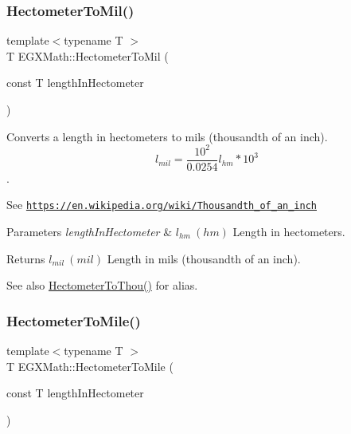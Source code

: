 \subsubsection{\texorpdfstring{Hectometer\+To\+Mil()}{HectometerToMil()}}
{\footnotesize\ttfamily template$<$typename T $>$ \\
T E\+G\+X\+Math\+::\+Hectometer\+To\+Mil (\begin{DoxyParamCaption}\item[{const T}]{length\+In\+Hectometer }\end{DoxyParamCaption})}



Converts a length in hectometers to mils (thousandth of an inch). \[ l_{mil}= \frac{10^{2}}{0.0254} l_{hm} * 10^{3} \]. 

See \href{https://en.wikipedia.org/wiki/Thousandth_of_an_inch}{\tt https\+://en.\+wikipedia.\+org/wiki/\+Thousandth\+\_\+of\+\_\+an\+\_\+inch} 
\begin{DoxyParams}{Parameters}
{\em length\+In\+Hectometer} & $ l_{hm}\ (hm)$ Length in hectometers. \\
\hline
\end{DoxyParams}
\begin{DoxyReturn}{Returns}
$ l_{mil}\ (mil)$ Length in mils (thousandth of an inch). 
\end{DoxyReturn}
\begin{DoxySeeAlso}{See also}
\mbox{\hyperlink{group___e_g_x_math-_conversions-_length_conversions-_s_i-_hectometer-_imperial_gabfd81bd5bb9e8293005c23794f541a1c}{Hectometer\+To\+Thou()}} for alias. 
\end{DoxySeeAlso}
\mbox{\label{group___e_g_x_math-_conversions-_length_conversions-_s_i-_hectometer-_imperial_gabb3930dfb3335dc53303ec8ce9145d71}} 
\subsubsection{\texorpdfstring{Hectometer\+To\+Mile()}{HectometerToMile()}}
{\footnotesize\ttfamily template$<$typename T $>$ \\
T E\+G\+X\+Math\+::\+Hectometer\+To\+Mile (\begin{DoxyParamCaption}\item[{const T}]{length\+In\+Hectometer }\end{DoxyParamCaption})}



